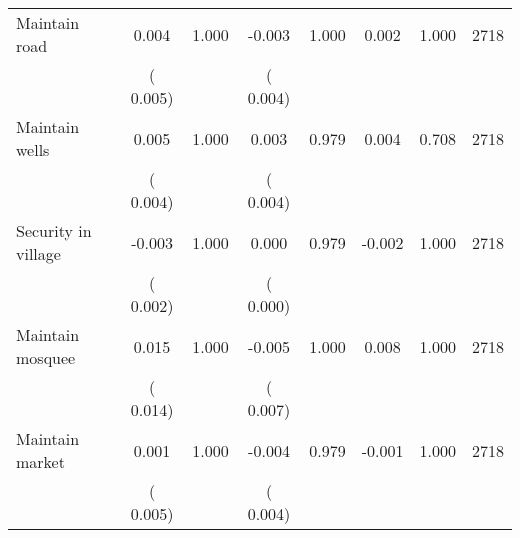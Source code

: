 \begin{tabular}{l*{7}{c}}
 Maintain road       &              0.004       &        1.000  &             -0.003       &        1.000  &              0.002       &              1.000 &  2718 \\ 
                       &       (       0.005)             &                               &       (       0.004)                     &                               &                                               &                                &                      \\ 

 Maintain wells       &              0.005       &        1.000  &              0.003       &        0.979  &              0.004       &              0.708 &  2718 \\ 
                       &       (       0.004)             &                               &       (       0.004)                     &                               &                                               &                                &                      \\ 

 Security in village       &             -0.003       &        1.000  &              0.000       &        0.979  &             -0.002       &              1.000 &  2718 \\ 
                       &       (       0.002)             &                               &       (       0.000)                     &                               &                                               &                                &                      \\ 

 Maintain mosquee       &              0.015       &        1.000  &             -0.005       &        1.000  &              0.008       &              1.000 &  2718 \\ 
                       &       (       0.014)             &                               &       (       0.007)                     &                               &                                               &                                &                      \\ 

 Maintain market       &              0.001       &        1.000  &             -0.004       &        0.979  &             -0.001       &              1.000 &  2718 \\ 
                       &       (       0.005)             &                               &       (       0.004)                     &                               &                                               &                                &                      \\ 

\hline \end{tabular}